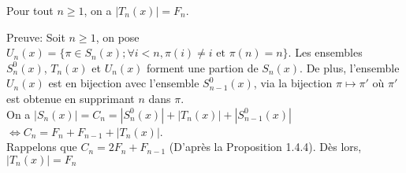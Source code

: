 	\begin{proposition}
		Pour tout $n\geq 1$, on a $|T_{n}(x)| = F_{n}$.
	\end{proposition}
	Preuve:
	Soit $n\geq 1$, on pose $U_{n}(x) = \{\pi \in S_{n}(x); \forall i<n, \pi(i)\neq i \text{ et } \pi(n)=n\}$. Les ensembles $S_{n}^{0}(x)$, $T_{n}(x)$ et $U_{n}(x)$ forment une partion de $S_{n}(x)$. De plus, l'ensemble $U_{n}(x)$ est en bijection avec l'ensemble $S_{n-1}^{0}(x)$, via la bijection $\pi \mapsto \pi'$ où $\pi'$ est obtenue en supprimant $n$ dans $\pi$. \\
	On a $| S_{n}(x) | = C_{n} = |S_{n}^{0}(x)| + |T_{n}(x)| + |S_{n-1}^{0}(x)|$
$\iff C_{n} = F_{n}+F_{n-1} + |T_{n}(x)|$.\\
	Rappelons que $C_{n} = 2F_{n} +F_{n-1}$ (D'après la Proposition 1.4.4). Dès lors, $| T_{n}(x) | = F_{n}$
